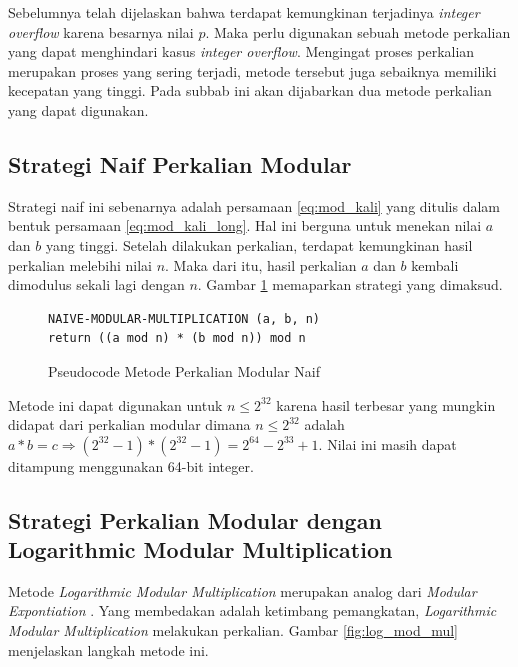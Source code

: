 Sebelumnya telah dijelaskan bahwa terdapat kemungkinan terjadinya \textit{integer overflow} karena besarnya nilai $ p $. Maka perlu digunakan sebuah metode perkalian yang dapat menghindari kasus \textit{integer overflow}. Mengingat proses perkalian merupakan proses yang sering terjadi, metode tersebut juga sebaiknya memiliki kecepatan yang tinggi. Pada subbab ini akan dijabarkan dua metode perkalian yang dapat digunakan.

\subsection{Strategi Naif Perkalian Modular}

Strategi naif ini sebenarnya adalah persamaan \eqref{eq:mod_kali} yang ditulis dalam bentuk persamaan \eqref{eq:mod_kali_long}. Hal ini berguna untuk menekan nilai $ a $ dan $ b $ yang tinggi. Setelah dilakukan perkalian, terdapat kemungkinan hasil perkalian melebihi nilai $ n $. Maka dari itu, hasil perkalian $ a $ dan $ b $ kembali dimodulus sekali lagi dengan $ n $. Gambar \ref{psdo:modmul_naive} memaparkan strategi yang dimaksud.

\begin{figure}[h!]
\begin{lstlisting}[firstnumber=0,captionpos=b]
NAIVE-MODULAR-MULTIPLICATION (a, b, n)
return ((a mod n) * (b mod n)) mod n
\end{lstlisting}
\caption{Pseudocode Metode Perkalian Modular Naif}
\label{psdo:modmul_naive}
\end{figure}

Metode ini dapat digunakan untuk $ n \leq 2^{32} $ karena hasil terbesar yang mungkin didapat dari perkalian modular dimana $ n \leq 2^{32} $ adalah $ a*b = c \Longrightarrow ( 2^{32}-1 ) * ( 2^{32}-1 ) = 2^{64} - 2^{33} + 1 $. Nilai ini masih dapat ditampung menggunakan 64-bit integer.

\subsection{Strategi Perkalian Modular dengan Logarithmic Modular Multiplication} 
Metode \textit{Logarithmic Modular Multiplication} merupakan analog dari \textit{Modular Expontiation} \cite{geeks_modular_multiplication}. Yang membedakan adalah ketimbang pemangkatan, \textit{Logarithmic Modular Multiplication} melakukan perkalian. Gambar \ref{fig:log_mod_mul} menjelaskan langkah metode ini.

